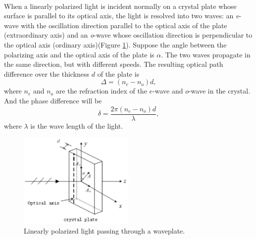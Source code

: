 \documentclass{my_template}
\begin{document}
    \paragraph{} When a linearly polarized light is incident normally on a crystal plate whose surface is parallel to its optical axis, the light is resolved into two waves: an {\itshape e}-wave with the oscillation direction parallel to the optical axis of the plate (extraordinary axis) and an {\itshape o}-wave whose oscillation direction is perpendicular to the optical axis (ordinary axis)(Figure \ref{fig: e-wave and o-wave}). Suppose the angle between the polarizing axis and the optical axis of the plate is $\alpha$. The two waves propagate in the same direction, but with different speeds. The resulting optical path difference over the thickness $d$ of the plate is $$\Delta=(n_e-n_o)d,$$ where $n_e$ and $n_o$ are the refraction index of the $e$-wave and $o$-wave in the crystal. And the phase difference will be $$\delta=\frac{2\pi(n_e-n_o)d}{\lambda},$$ where $\lambda$ is the wave length of the light.
    \begin{figure}[!ht]
        \centering
        \includegraphics[width=0.5\textwidth]{fig/plate.png}
        \caption{Linearly polarized light passing through a waveplate.}
        \label{fig: e-wave and o-wave}
    \end{figure}
\end{document}
